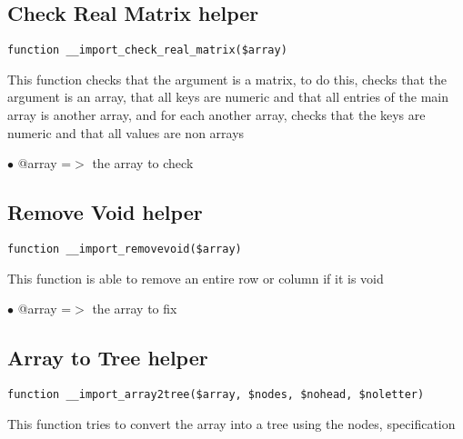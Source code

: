 \documentclass[a4paper]{book}
\begin{document}
\hypertarget{toc158}{}
\subsection{Check Real Matrix helper}

\begin{lstlisting}
function __import_check_real_matrix($array)
\end{lstlisting}

This function checks that the argument is a matrix, to do this, checks
that the argument is an array, that all keys are numeric and that all
entries of the main array is another array, and for each another array,
checks that the keys are numeric and that all values are non arrays

\begin{compactitem}
\item[\color{myblue}$\bullet$] @array =$>$ the array to check
\end{compactitem}

\hypertarget{toc159}{}
\subsection{Remove Void helper}

\begin{lstlisting}
function __import_removevoid($array)
\end{lstlisting}

This function is able to remove an entire row or column if it is void

\begin{compactitem}
\item[\color{myblue}$\bullet$] @array =$>$ the array to fix
\end{compactitem}

\hypertarget{toc160}{}
\subsection{Array to Tree helper}

\begin{lstlisting}
function __import_array2tree($array, $nodes, $nohead, $noletter)
\end{lstlisting}

This function tries to convert the array into a tree using the nodes,
specification
\end{document}
